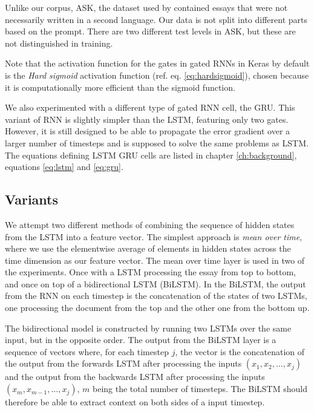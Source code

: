 Unlike our corpus, ASK, the dataset used by \citeauthor{taghipour16}
contained essays that were not necessarily written in a second language. Our
data is not split into different parts based on the prompt. There are two
different test levels in ASK, but these are not distinguished in training.

Note that the activation function for the gates in gated RNNs in Keras by
default is the \emph{Hard sigmoid} activation function (ref. eq.
\ref{eq:hardsigmoid}), chosen because it is computationally more efficient
than the sigmoid function.

We also experimented with a different type of gated \ac{RNN} cell, the
\ac{GRU}. This variant of \ac{RNN} is slightly simpler than the \ac{LSTM},
featuring only two gates. However, it is still designed to be able to
propagate the error gradient over a larger number of timesteps and is
supposed to solve the same problems as \ac{LSTM}. The equations defining
\ac{LSTM} \ac{GRU} cells are listed in chapter \ref{ch:background}, equations
\ref{eq:lstm} and \ref{eq:gru}.


\subsection{Variants}

We attempt two different methods of combining the sequence of hidden states
from the \ac{LSTM} into a feature vector. The simplest approach is \emph{mean
over time}, where we use the elementwise average of elements in hidden states
across the time dimension as our feature vector. The mean over time layer is
used in two of the experiments. Once with a \ac{LSTM} processing the essay
from top to bottom, and once on top of a bidirectional LSTM (BiLSTM). In the
BiLSTM, the output from the \ac{RNN} on each timestep is the concatenation of
the states of two \acp{LSTM}, one processing the document from the top and
the other one from the bottom up.

 The bidirectional model is constructed by
running two \acp{LSTM} over the same input, but in the opposite order. The
output from the BiLSTM layer is a sequence of vectors where, for each
timestep $j$, the vector is the concatenation of the output from the forwards
\ac{LSTM} after processing the inputs $(x_1, x_2, \ldots, x_j)$ and the
output from the backwards \ac{LSTM} after processing the inputs $(x_m,
x_{m-1}, \ldots, x_j)$, $m$ being the total number of timesteps. The BiLSTM
should therefore be able to extract context on both sides of a input
timestep.

